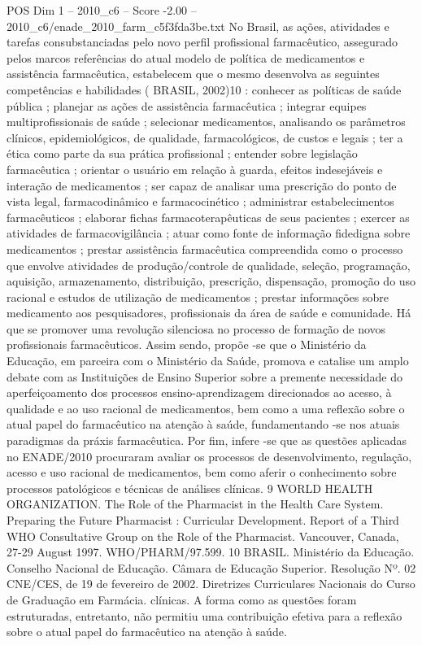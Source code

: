 \begin{textsample}{POS Dim 1 – 2010\_c6 – Score -2.00 – 2010\_c6/enade\_2010\_farm\_c5f3fda3be.txt}
No Brasil, as ações, atividades e tarefas consubstanciadas pelo novo perfil profissional farmacêutico, assegurado pelos marcos referências do atual modelo de política de medicamentos e assistência farmacêutica, estabelecem que o mesmo desenvolva as seguintes competências e habilidades ( BRASIL, 2002)10 : conhecer as políticas de saúde pública ; planejar as ações de assistência farmacêutica ; integrar equipes multiprofissionais de saúde ; selecionar medicamentos, analisando os parâmetros clínicos, epidemiológicos, de qualidade, farmacológicos, de custos e legais ; ter a ética como parte da sua prática profissional ; entender sobre legislação farmacêutica ; orientar o usuário em relação à guarda, efeitos indesejáveis e interação de medicamentos ; ser capaz de analisar uma prescrição do ponto de vista legal, farmacodinâmico e farmacocinético ; administrar estabelecimentos farmacêuticos ; elaborar fichas farmacoterapêuticas de seus pacientes ; exercer as atividades de farmacovigilância ; atuar como fonte de informação fidedigna sobre medicamentos ; prestar assistência farmacêutica compreendida como o processo que envolve atividades de produção/controle de qualidade, seleção, programação, aquisição, armazenamento, distribuição, prescrição, dispensação, promoção do uso racional e estudos de utilização de medicamentos ; prestar informações sobre medicamento aos pesquisadores, profissionais da área de saúde e comunidade.
Há que se promover uma revolução silenciosa no processo de formação de novos profissionais farmacêuticos.
Assim sendo, propõe -se que o Ministério da Educação, em parceira com o Ministério da Saúde, promova e catalise um amplo debate com as Instituições de Ensino Superior sobre a premente necessidade do aperfeiçoamento dos processos ensino-aprendizagem direcionados ao acesso, à qualidade e ao uso racional de medicamentos, bem como a uma reflexão sobre o atual papel do farmacêutico na atenção à saúde, fundamentando -se nos atuais paradigmas da práxis farmacêutica.
Por fim, infere -se que as questões aplicadas no ENADE/2010 procuraram avaliar os processos de desenvolvimento, regulação, acesso e uso racional de medicamentos, bem como aferir o conhecimento sobre processos patológicos e técnicas de análises clínicas. 9 WORLD HEALTH ORGANIZATION.
The Role of the Pharmacist in the Health Care System.
Preparing the Future Pharmacist : Curricular Development.
Report of a Third WHO Consultative Group on the Role of the Pharmacist.
Vancouver, Canada, 27-29 August 1997.
WHO/PHARM/97.599. 10 BRASIL.
Ministério da Educação.
Conselho Nacional de Educação.
Câmara de Educação Superior.
Resolução Nº. 02 CNE/CES, de 19 de fevereiro de 2002.
Diretrizes Curriculares Nacionais do Curso de Graduação em Farmácia. clínicas.
A forma como as questões foram estruturadas, entretanto, não permitiu uma contribuição efetiva para a reflexão sobre o atual papel do farmacêutico na atenção à saúde.

\end{textsample}
